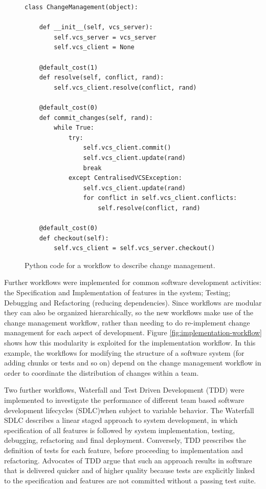 \documentclass{llncs}
\begin{document}
\begin{figure}
  \centering
\begin{lstlisting}
class ChangeManagement(object):

    def __init__(self, vcs_server):
        self.vcs_server = vcs_server
        self.vcs_client = None

    @default_cost(1)
    def resolve(self, conflict, rand):
        self.vcs_client.resolve(conflict, rand)

    @default_cost(0)
    def commit_changes(self, rand):
        while True:
            try:
                self.vcs_client.commit()
                self.vcs_client.update(rand)
                break
            except CentralisedVCSException:
                self.vcs_client.update(rand)
                for conflict in self.vcs_client.conflicts:
                    self.resolve(conflict, rand)

    @default_cost(0)
    def checkout(self):
        self.vcs_client = self.vcs_server.checkout()
\end{lstlisting}
  
  \caption{Python code for a workflow to describe change management.}
  \label{fig:change-management-workflow}
\end{figure}

Further workflows were implemented for common software development activities: the Specification and Implementation of
features in the system; Testing; Debugging and Refactoring (reducing dependencies).  Since workflows are modular they
can also be organized hierarchically, so the new workflows make use of the change management workflow, rather than
needing to do re-implement change management for each aspect of development.  Figure \ref{fig:implementation-workflow}
shows how this modularity is exploited for the implementation workflow. In this example, the workflows for modifying the
structure of a software system (for adding chunks or tests and so on) depend on the change management workflow in order
to coordinate the distribution of changes within a team.

Two further workflows, Waterfall and Test Driven Development (TDD) were implemented to investigate the performance of
different team based software development lifecycles (SDLC)when subject to variable behavior.  The Waterfall SDLC
\cite{benington83production} describes a linear staged approach to system development, in which specification of all
features is followed by system implementation, testing, debugging, refactoring and final deployment.  Conversely, TDD
\cite{beck02test} prescribes the definition of tests for each feature, before proceeding to implementation and
refactoring.  Advocates of TDD argue that such an approach results in software that is delivered quicker and of higher
quality because tests are explicitly linked to the specification and features are not committed without a passing test
suite.
\end{document}
